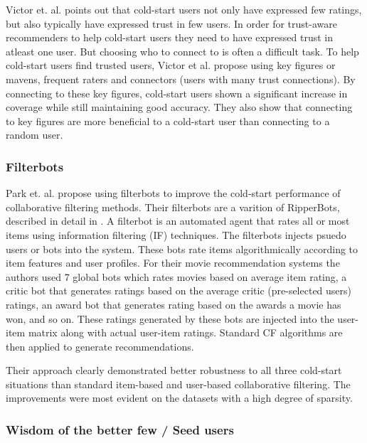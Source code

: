 Victor et. al. \cite{Victor2008} points out that cold-start users not only have
expressed few ratings, but also typically have expressed trust in few users. In
order for trust-aware recommenders to help cold-start users they need to have
expressed trust in atleast one user. But choosing who to connect to is often a
difficult task. To help cold-start users find trusted users, Victor et al.
propose using key figures or mavens, frequent raters and connectors (users with
many trust connections). By connecting to these key figures, cold-start users
shown a significant increase in coverage while still maintaining good accuracy.
They also show that connecting to key figures are more beneficial to a
cold-start user than connecting to a random user.

\subsubsection{Filterbots}


Park et. al. \cite{Park2006} propose using filterbots to improve the cold-start
performance of collaborative filtering methods. Their filterbots are a varition
of RipperBots, described in detail in \cite{Good1999}. A filterbot is an
automated agent that rates all or most items using information filtering (IF)
techniques. The filterbots injects psuedo users or bots into the system. These
bots rate items algorithmically according to item features and user profiles.
For their movie recommendation systems the authors used 7 global bots which
rates movies based on average item rating, a critic bot that generates ratings
based on the average critic (pre-selected users) ratings, an award bot that
generates rating based on the awards a movie has won, and so on. These ratings
generated by these bots are injected into the user-item matrix along with
actual user-item ratings. Standard CF algorithms are then applied to generate
recommendations.

Their approach clearly demonstrated better robustness to all three cold-start situations than standard item-based
and user-based collaborative filtering. The improvements were most evident on
the datasets with a high degree of sparsity.


\subsubsection{Wisdom of the better few / Seed users}

